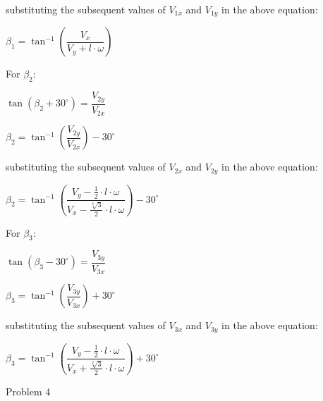 \documentclass[answers]{exam}
\begin{document}
\begin{questions}
\begin{parts}
\begin{solution}
            substituting the subsequent values of $V_{1x}$ and $V_{1y}$ in the above
            equation:

            $\beta_1 = \tan^{-1}(\dfrac{V_x}{V_y + l \cdot \omega})$

            For $\beta_2$:

            $\tan(\beta_2 + 30^\circ) = \dfrac{V_{2y}}{V_{2x}}$

            $\beta_2 = \tan^{-1}(\dfrac{V_{2y}}{V_{2x}}) - 30^\circ$

            substituting the subsequent values of $V_{2x}$ and $V_{2y}$ in the above
            equation:

            $\beta_2 = \tan^{-1}(\dfrac{V_y - \frac{1}{2} \cdot l \cdot \omega}{V_x - \frac{\sqrt[2]{3}}{2} \cdot l \cdot \omega}) - 30^\circ$

            For $\beta_3$:

            $\tan(\beta_3 - 30^\circ) = \dfrac{V_{3y}}{V_{3x}}$

            $\beta_3 = \tan^{-1}(\dfrac{V_{3y}}{V_{3x}}) + 30^\circ$

            substituting the subsequent values of $V_{3x}$ and $V_{3y}$ in the above
            equation:

            $\beta_3 = \tan^{-1}(\dfrac{V_y - \frac{1}{2} \cdot l \cdot \omega}{V_x + \frac{\sqrt[2]{3}}{2} \cdot l \cdot \omega}) + 30^\circ$

        \end{solution}
    \end{parts}

    \question Problem 4
\end{questions}
\end{document}
